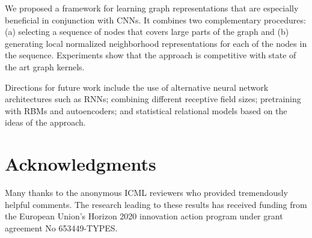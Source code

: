 \documentclass{article}
\begin{document}
We proposed a framework for learning graph representations that are especially beneficial in conjunction with CNNs. It combines two complementary procedures: (a) selecting a sequence of nodes that covers large parts of the graph and (b) generating local normalized neighborhood representations for each of the nodes in the sequence.
Experiments show that the approach is competitive with state of the art graph kernels. 

Directions for future work include the use of alternative neural network architectures such as RNNs; combining different receptive field sizes; pretraining with RBMs and autoencoders; and statistical relational models based on the ideas of the approach. \vspace{-1mm}
\section*{Acknowledgments}
Many thanks to the anonymous ICML reviewers who provided tremendously helpful comments. The research leading to these results has received
funding from the European Union's Horizon 2020 innovation action program under grant agreement No 653449-TYPES.





\end{document}
